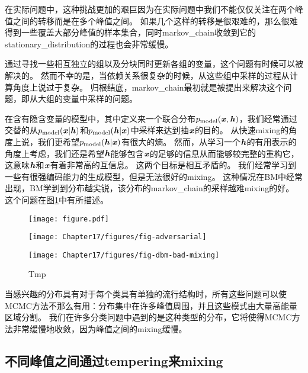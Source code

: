 在实际问题中，这种挑战更加的艰巨因为在实际问题中我们不能仅仅关注在两个峰值之间的转移而是在多个峰值之间。
如果几个这样的转移是很艰难的，那么很难得到一些覆盖大部分峰值的样本集合，同时\gls{markov_chain}收敛到它的\gls{stationary_distribution}的过程也会非常缓慢。

通过寻找一些相互独立的组以及分块同时更新各组的变量，这个问题有时候可以被解决的。
然而不幸的是，当依赖关系很复杂的时候，从这些组中采样的过程从计算角度上说过于复杂。
归根结底，\gls{markov_chain}最初就是被提出来解决这个问题，即从大组的变量中采样的问题。

在含有隐含变量的模型中，其中定义来一个联合分布$p_{\text{model}}(\boldsymbol{\mathit{x}},\boldsymbol{\mathit{h}})$，我们经常通过交替的从$p_{\text{model}}(\boldsymbol{\mathit{x}}\vert \boldsymbol{\mathit{h}})$和$p_{\text{model}}(\boldsymbol{\mathit{h}}\vert \boldsymbol{\mathit{x}})$中采样来达到抽$\boldsymbol{\mathit{x}}$的目的。
从快速\gls{mixing}的角度上说，我们更希望$p_{\text{model}}(\boldsymbol{\mathit{h}}\vert \boldsymbol{\mathit{x}})$有很大的熵。
然而，从学习一个$\boldsymbol{\mathit{h}}$的有用表示的角度上考虑，我们还是希望$\boldsymbol{\mathit{h}}$能够包含$\boldsymbol{\mathit{x}}$的足够的信息从而能够较完整的重构它，这意味$\boldsymbol{\mathit{h}}$和$\boldsymbol{\mathit{x}}$有着非常高的互信息。
这两个目标是相互矛盾的。
我们经常学习到一些有很强编码能力的生成模型，但是无法很好的\gls{mixing}。
这种情况在\gls{BM}中经常出现，\gls{BM}学到到分布越尖锐，该分布的\gls{markov_chain}的采样越难\gls{mixing}的好。
这个问题在图\ref{fig:chap17_fig-dbm-bad-mixing}中有所描述。

\begin{figure}[!htb]
\ifOpenSource
\centerline{\texttt{[image: figure.pdf]}}
\else
	\centerline{\texttt{[image: Chapter17/figures/fig-adversarial]}}
	\centerline{\texttt{[image: Chapter17/figures/fig-dbm-bad-mixing]}}	
\fi
	\caption{Tmp}
	\label{fig:chap17_fig-dbm-bad-mixing}
\end{figure}


当感兴趣的分布具有对于每个类具有单独的流行结构时，所有这些问题可以使MCMC方法不那么有用：分布集中在许多峰值周围，并且这些模式由大量高能量区域分割。
我们在许多分类问题中遇到的是这种类型的分布，它将使得MCMC方法非常缓慢地收敛，因为峰值之间的\gls{mixing}缓慢。



\subsection{不同峰值之间通过\gls{tempering}来\gls{mixing}}
\label{sec:tempering_to_mix_between_modes}

